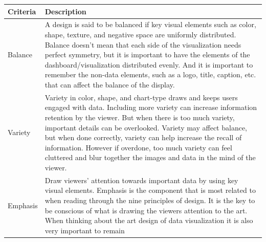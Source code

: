 \documentclass[]{book}
\theoremstyle{definition}
\theoremstyle{definition}
\theoremstyle{definition}
\theoremstyle{remark}
\begin{document}
\begin{longtable}[]{@{}ll@{}}
\toprule
\begin{minipage}[b]{0.16\columnwidth}\raggedright\strut
\textbf{Criteria}\strut
\end{minipage} & \begin{minipage}[b]{0.78\columnwidth}\raggedright\strut
\textbf{Description}\strut
\end{minipage}\tabularnewline
\midrule
\endhead
\begin{minipage}[t]{0.16\columnwidth}\raggedright\strut
Balance\strut
\end{minipage} & \begin{minipage}[t]{0.78\columnwidth}\raggedright\strut
A design is said to be balanced if key visual elements such as color,
shape, texture, and negative space are uniformly distributed. Balance
doesn't mean that each side of the visualization needs perfect symmetry,
but it is important to have the elements of the dashboard/visualization
distributed evenly. And it is important to remember the non-data
elements, such as a logo, title, caption, etc. that can affect the
balance of the display.\strut
\end{minipage}\tabularnewline
\begin{minipage}[t]{0.16\columnwidth}\raggedright\strut
Variety\strut
\end{minipage} & \begin{minipage}[t]{0.78\columnwidth}\raggedright\strut
Variety in color, shape, and chart-type draws and keeps users engaged
with data. Including more variety can increase information retention by
the viewer. But when there is too much variety, important details can be
overlooked. Variety may affect balance, but when done correctly, variety
can help increase the recall of information. However if overdone, too
much variety can feel cluttered and blur together the images and data in
the mind of the viewer.\strut
\end{minipage}\tabularnewline
\begin{minipage}[t]{0.16\columnwidth}\raggedright\strut
Emphasis\strut
\end{minipage} & \begin{minipage}[t]{0.78\columnwidth}\raggedright\strut
Draw viewers' attention towards important data by using key visual
elements. Emphasis is the component that is most related to when reading
through the nine principles of design. It is the key to be conscious of
what is drawing the viewers attention to the art. When thinking about
the art design of data visualization it is also very important to remain

\end{minipage}
\end{longtable}
\end{document}
